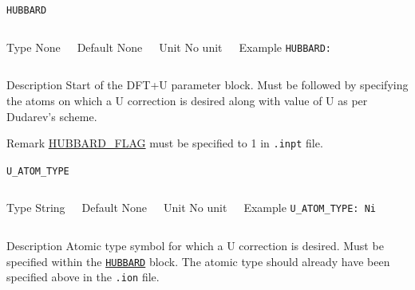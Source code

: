 \begin{frame}[allowframebreaks]{\texttt{HUBBARD}} \label{HUBBARD}
\vspace*{-12pt}
\begin{columns}
\begin{block}{Type}
None
\end{block}

\begin{block}{Default}
None
\end{block}

\begin{block}{Unit}
No unit
\end{block}

\begin{block}{Example}
\texttt{HUBBARD: \\}
  
\end{block}
\end{columns}

\begin{block}{Description}
Start of the DFT+U parameter block. Must be followed by specifying the atoms on which a U correction is desired along with value of U as per Dudarev's scheme.
\end{block}

\begin{block}{Remark}
\hyperlink{HUBBARD_FLAG}{HUBBARD\_FLAG} must be specified to 1 in \texttt{.inpt} file.
\end{block}

\end{frame}
\begin{frame}[allowframebreaks]{\texttt{U\_ATOM\_TYPE}} \label{U_ATOM_TYPE}
\vspace*{-12pt}
\begin{columns}
\begin{block}{Type}
String
\end{block}

\begin{block}{Default}
None
\end{block}

\begin{block}{Unit}
No unit
\end{block}

\begin{block}{Example}
\texttt{U\_ATOM\_TYPE: Ni \\}
\end{block}
\end{columns}

\begin{block}{Description}
Atomic type symbol for which a U correction is desired. Must be specified within the \hyperlink{HUBBARD}{\texttt{HUBBARD}} block. The atomic type should already have been specified above in the \texttt{.ion} file.
\end{block}

\end{frame}
